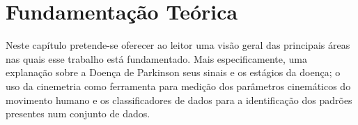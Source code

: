\chapter{Fundamentação Teórica}\label{chapter:fundamentacao}
Neste capítulo pretende-se oferecer ao leitor uma visão geral das principais áreas nas quais esse trabalho está fundamentado. Mais especificamente, uma explanação sobre a Doença de Parkinson seus sinais e os estágios da doença; o uso da cinemetria como ferramenta para medição dos parâmetros cinemáticos do movimento humano e os classificadores de dados para a identificação dos padrões presentes num conjunto de dados.






